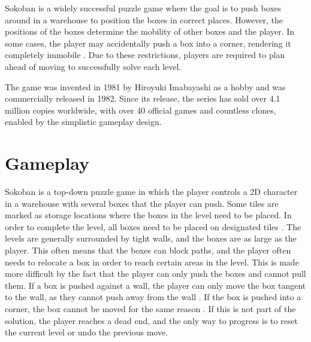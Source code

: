 Sokoban is a widely successful puzzle game where the goal is to push boxes around in a warehouse to position the boxes in correct places. However, the positions of the boxes determine the mobility of other boxes and the player. In some cases, the player may accidentally push a box into a corner, rendering it completely immobile \cite{junghanns1999pushing}. Due to these restrictions, players are required to plan ahead of moving to successfully solve each level.

The game was invented in 1981 by Hiroyuki Imabayashi as a hobby and was commercially released in 1982. Since its release, the series has sold over 4.1 million copies worldwide, with over 40 official games and countless clones, enabled by the simplistic gameplay design.

\section{Gameplay}
Sokoban is a top-down puzzle game in which the player controls a 2D character in a warehouse with several boxes that the player can push. Some tiles are marked as storage locations where the boxes in the level need to be placed. In order to complete the level, all boxes need to be placed on designated tiles \cite{murase1996automatic}. The levels are generally surrounded by tight walls, and the boxes are as large as the player. This often means that the boxes can block paths, and the player often needs to relocate a box in order to reach certain areas in the level. This is made more difficult by the fact that the player can only push the boxes and cannot pull them. If a box is pushed against a wall, the player can only move the box tangent to the wall, as they cannot push away from the wall \cite{sokoban_official_whatis}. If the box is pushed into a corner, the box cannot be moved for the same reason \cite{micomgames1983sokoban}. If this is not part of the solution, the player reaches a dead end, and the only way to progress is to reset the current level or undo the previous move.

